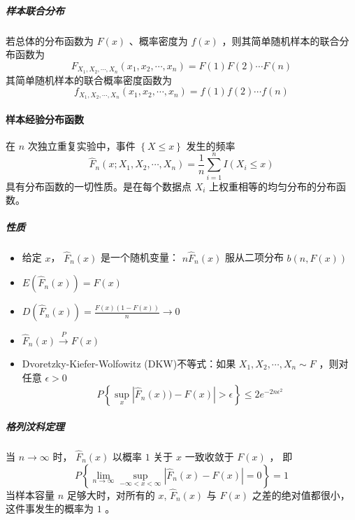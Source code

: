 \subparagraph{样本联合分布} 若总体的分布函数为 $ F(x) $ 、概率密度为 $ f(x) $ ，则其简单随机样本的联合分布函数为
\begin{equation}
    F_{X_1, X_2, \cdots, X_n}(x_1, x_2, \cdots, x_n) = F(1) F(2) \cdots F(n)
\end{equation}
其简单随机样本的联合概率密度函数为
\begin{equation}
    f_{X_1, X_2, \cdots, X_n}(x_1, x_2, \cdots, x_n) = f(1) f(2) \cdots f(n)
\end{equation}

\paragraph{样本经验分布函数} 在 $ n $ 次独立重复实验中，事件 $ \left\{ X \leqslant x \right\}  $ 发生的频率
\begin{equation}
    \hat{F}_n(x;X_1, X_2, \cdots, X_n) = \frac{1}{n} \sum_{i=1}^{n} I(X_i \leqslant x)
\end{equation}
具有分布函数的一切性质。是在每个数据点 $ X_i $ 上权重相等的均匀分布的分布函数。

\subparagraph{性质}
\begin{itemize}[leftmargin=\subparitemindent]
    \item 给定 $ x $， $ \hat{F}_n(x) $ 是一个随机变量： $ n\hat{F}_n(x) $ 服从二项分布 $ b(n, F(x)) $ 
    \item $ E(\hat{F}_n(x)) = F(x) $
    \item $ D(\hat{F}_n(x)) = \frac{F(x)(1-F(x))}{n} \rightarrow 0 $
    \item $ \hat{F}_n(x) \xrightarrow{P} F(x) $
    \item Dvoretzky-Kiefer-Wolfowitz (DKW)不等式：如果 $ X_1, X_2, \cdots, X_n \sim F $ ，则对任意 $ \epsilon > 0 $
    \begin{equation}
        P\left\{ \sup_x \left| \hat{F}_n(x)) - F(x) \right| > \epsilon \right\}  \leqslant 2e^{-2n\epsilon^2}
    \end{equation}
\end{itemize}

\subparagraph{格列汶科定理} 当 $ n \rightarrow \infty $ 时， $ \hat{F}_n(x) $ 以概率 $ 1 $ 关于 $ x $ 一致收敛于 $ F(x) $ ，
即
\begin{equation}
    P\left\{ \lim_{n\rightarrow\infty} \sup_{-\infty<x<\infty} \left| \hat{F}_n(x) - F(x) \right| = 0 \right\} = 1
\end{equation}
当样本容量 $ n $ 足够大时，对所有的 $ x $,  $ \hat{F}_n(x) $ 与 $ F(x) $ 之差的绝对值都很小，这件事发生的概率为 $ 1 $ 。